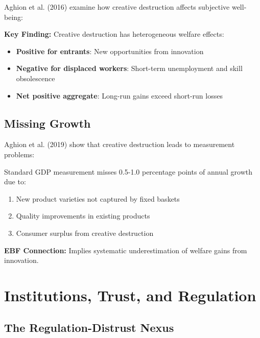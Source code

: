 Aghion et al. (2016) examine how creative destruction affects subjective well-being:

\begin{tcolorbox}[colback=blue!5!white, colframe=blue!75!black]
\textbf{Key Finding:} Creative destruction has heterogeneous welfare effects:
\begin{itemize}
    \item \textbf{Positive for entrants}: New opportunities from innovation
    \item \textbf{Negative for displaced workers}: Short-term unemployment and skill obsolescence
    \item \textbf{Net positive aggregate}: Long-run gains exceed short-run losses
\end{itemize}
\end{tcolorbox}

\subsection{Missing Growth}

Aghion et al. (2019) show that creative destruction leads to measurement problems:

\begin{axiom}
\label{ax:pa4}
Standard GDP measurement misses 0.5-1.0 percentage points of annual growth due to:
\begin{enumerate}
    \item New product varieties not captured by fixed baskets
    \item Quality improvements in existing products
    \item Consumer surplus from creative destruction
\end{enumerate}
\textbf{EBF Connection:} Implies systematic underestimation of welfare gains from innovation.
\end{axiom}

\section{Institutions, Trust, and Regulation}

\subsection{The Regulation-Distrust Nexus}

